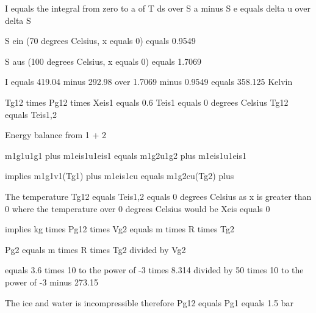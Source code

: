 I equals the integral from zero to a of T ds over S a minus S e equals delta u over delta S

S ein (70 degrees Celsius, x equals 0) equals 0.9549

S aus (100 degrees Celsius, x equals 0) equals 1.7069

I equals 419.04 minus 292.98 over 1.7069 minus 0.9549 equals 358.125 Kelvin

Tg12 times Pg12 times Xeis1 equals 0.6  
Teis1 equals 0 degrees Celsius  
Tg12 equals Teis1,2  

Energy balance from 1 + 2  

m1g1u1g1 plus m1eis1u1eis1 equals m1g2u1g2 plus m1eis1u1eis1  

implies m1g1v1(Tg1) plus m1eis1cu equals m1g2cu(Tg2) plus  

The temperature Tg12 equals Teis1,2 equals 0 degrees Celsius as x is greater than 0  
where the temperature over 0 degrees Celsius would be Xeis equals 0  

implies kg times Pg12 times Vg2 equals m times R times Tg2  

Pg2 equals m times R times Tg2 divided by Vg2  

equals 3.6 times 10 to the power of -3 times 8.314 divided by 50 times 10 to the power of -3 minus 273.15  

The ice and water is incompressible  
therefore Pg12 equals Pg1 equals 1.5 bar